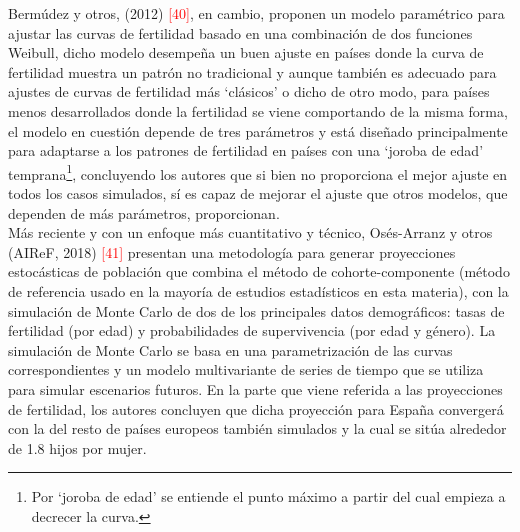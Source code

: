 Bermúdez y otros, (2012) \textcolor{red}{[40]}, en cambio, proponen un modelo paramétrico para ajustar las curvas de fertilidad basado en una combinación de dos funciones Weibull, dicho modelo desempeña un buen ajuste en países donde la curva de fertilidad muestra un patrón no tradicional y aunque también es adecuado para ajustes de curvas de fertilidad más `clásicos' o dicho de otro modo, para países menos desarrollados donde la fertilidad se viene comportando de la misma forma, el modelo en cuestión depende de tres parámetros y está diseñado principalmente para adaptarse a los patrones de fertilidad en países con una `joroba de edad' temprana\footnote{Por `joroba de edad' se entiende el punto máximo a partir del cual empieza a decrecer la curva.}, concluyendo los autores que si bien no proporciona el mejor ajuste en todos los casos simulados, sí es capaz de mejorar el ajuste que otros modelos, que dependen de más parámetros, proporcionan.\\

\vspace{-0.3cm}
Más reciente y con un enfoque más cuantitativo y técnico, Osés-Arranz y otros (AIReF, 2018) \textcolor{red}{[41]} presentan una metodología para generar proyecciones estocásticas de población que combina el método de cohorte-componente (método de referencia usado en la mayoría de estudios estadísticos en esta materia), con la simulación de Monte Carlo de dos de los principales datos demográficos: tasas de fertilidad (por edad) y probabilidades de supervivencia (por edad y género). La simulación de Monte Carlo se basa en una parametrización de las curvas correspondientes y un modelo multivariante de series de tiempo que se utiliza para simular escenarios futuros. En la parte que viene referida a las proyecciones de fertilidad, los autores concluyen que dicha proyección para España convergerá con la del resto de países europeos también simulados y la cual se sitúa alrededor de 1.8 hijos por mujer.\\

